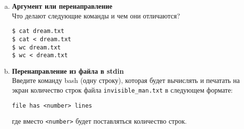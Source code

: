 \documentclass{article}
\begin{document}
\begin{enumerate}[a.]
\item \textbf{Аргумент или перенаправление}\\
Что делают следующие команды и чем они отличаются?
\begin{lstlisting}
$ cat dream.txt
$ cat < dream.txt
$ wc dream.txt
$ wc < dream.txt
\end{lstlisting}


\item \textbf{Перенаправление из файла в stdin}\\
Введите команду bash (одну строку), которая будет вычислять и печатать на экран количество строк файла \texttt{invisible\_man.txt} в следующем формате:
\begin{lstlisting}
file has <number> lines
\end{lstlisting}
где вместо \texttt{<number>} будет поставляться количество строк.

\end{enumerate}


\newpage
\end{document}
